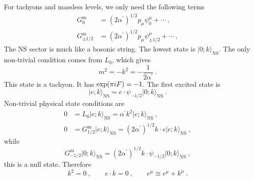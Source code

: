 	For tachyons and massless levels, we only need the following terms
	\begin{subequations}
		\begin{align}
			G_{0}^{\text{m}} &= (2\alpha^{\prime})^{1/2} p_{\mu}\psi_{0}^{\mu} +\cdots \:, \label{10.5.6a} \\
			G_{\pm 1/2}^{\text{m}} &= (2\alpha^{\prime})^{1/2} p_{\mu}\psi_{\pm 1/2}^{\mu} +\cdots \:, \label{10.5.6b}
		\end{align} \label{10.5.6}
	\end{subequations}
	The NS sector is much like a bosonic string. The lowest state is $\lvert 0;k\rangle_{\text{NS}}$. The only non-trivial condition comes from $L_{0}$, which gives
	\begin{equation}
		m^{2}=-k^{2} = -\frac{1}{2\alpha^{\prime}} \:. \label{10.5.7}
	\end{equation}
	This state is a tachyon. It has $\exp(\pi i F)=-1$. The first excited state is
	\begin{equation}
		\lvert e;k \rangle_{\text{NS}} = e\cdot \psi_{-1/2} \lvert 0;k\rangle _{\text{NS}} \:. \label{10.5.8}
	\end{equation}
	Non-trivial physical state conditions are
	\begin{subequations}
		\begin{align} 
			0 &= L_{0} \lvert e;k\rangle_{\text{NS}}=\alpha^{\prime} k^{2} \lvert e;k\rangle_{\text{NS}} \:, \label{10.5.9a} \\
			0 &= G_{1/2}^{\text{m}}\lvert e;k\rangle_{\text{NS}}=(2\alpha^{\prime})^{1/2}k\cdot e\lvert e;k\rangle_{\text{NS}}\:, \label{10.5.9b}
		\end{align}  \label{10.5.9} %
	\end{subequations}
	while
	\begin{equation}
		G_{-1/2}^{\text{m}}\lvert 0;k\rangle_{\text{NS}}=(2\alpha^{\prime})^{1/2}k\cdot \psi_{-1/2}
		\lvert 0;k\rangle_{\text{NS}}\:, \label{10.5.10}
	\end{equation}
	this is a null state. Therefore
	\begin{equation}
		k^{2}=0 \:,\qquad e\cdot k=0\:, \qquad e^{\mu}\cong e^{\mu} + k^{\mu} \:. \label{10.5.11}
	\end{equation}
